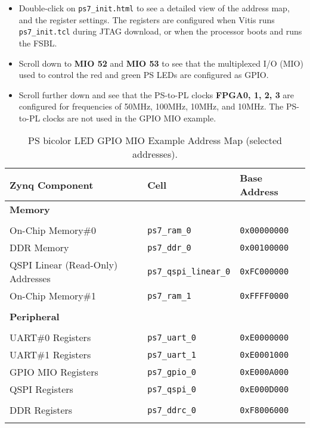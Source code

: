 \begin{enumerate}
\begin{itemize}
\item Double-click on \verb+ps7_init.html+ to see a detailed view
of the address map, and the register settings. The registers are configured
when Vitis runs \texttt{ps7\_init.tcl} during JTAG download, or when the
processor boots and runs the FSBL.

\item Scroll down to \textbf{MIO 52} and \textbf{MIO 53} to see that the
multiplexed I/O (MIO) used to control the red and green PS LEDs are configured
as GPIO.

\item Scroll further down and see that the PS-to-PL clocks
\textbf{FPGA0, 1, 2, 3} are configured for frequencies of
50MHz, 100MHz, 10MHz, and 10MHz. The PS-to-PL clocks are not used
in the GPIO MIO example.
\end{itemize}

%
\begin{table}[t]
\caption{PS bicolor LED GPIO MIO Example Address Map (selected addresses).}
\label{tab:blinky_gpio_mio}
\begin{center}
\begin{tabular}{|l|l|l|}
\hline
Zynq Component & Cell & Base Address\\
\hline\hline
\textbf{Memory} &&\\
\hline
&&\\
On-Chip Memory\#0                 & \texttt{ps7\_ram\_0}          & \texttt{0x00000000}\\
DDR Memory                        & \texttt{ps7\_ddr\_0}          & \texttt{0x00100000}\\
QSPI Linear (Read-Only) Addresses & \texttt{ps7\_qspi\_linear\_0} & \texttt{0xFC000000}\\
On-Chip Memory\#1                 & \texttt{ps7\_ram\_1}          & \texttt{0xFFFF0000}\\
&&\\
\hline
\textbf{Peripheral} &&\\
\hline
&&\\
UART\#0 Registers    & \texttt{ps7\_uart\_0}         & \texttt{0xE0000000}\\
UART\#1 Registers    & \texttt{ps7\_uart\_1}         & \texttt{0xE0001000}\\
GPIO MIO  Registers  & \texttt{ps7\_gpio\_0}         & \texttt{0xE000A000}\\
QSPI Registers       & \texttt{ps7\_qspi\_0}         & \texttt{0xE000D000}\\
&&\\
DDR Registers        & \texttt{ps7\_ddrc\_0}         & \texttt{0xF8006000}\\
&&\\
\hline
\end{tabular}
\end{center}
\end{table}


\end{enumerate}
